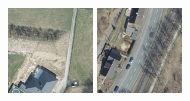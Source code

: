 \begin{figure}
    \newcommand{\LabelConsiderationImageWidth}{0.2\textwidth}
    \centering
    \includegraphics[width=\LabelConsiderationImageWidth]{images/consideration_labels/44883}
    \hspace{1mm}
    \includegraphics[width=\LabelConsiderationImageWidth]{images/consideration_labels/150815}

\end{figure}
